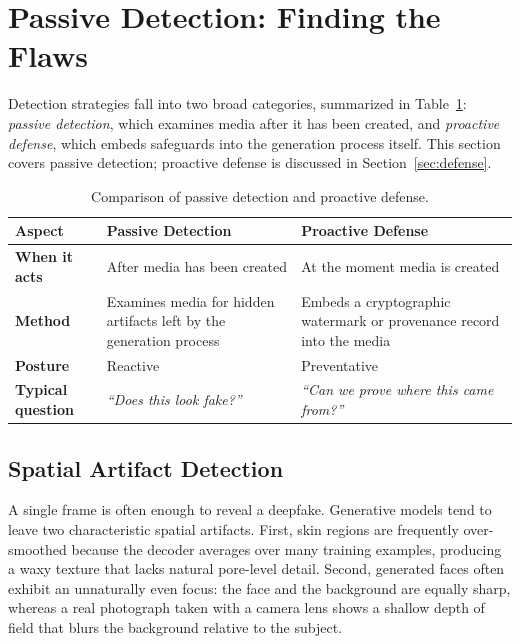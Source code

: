 \documentclass[a4paper,12pt]{article}
\begin{document}
\section{Passive Detection: Finding the Flaws}
\label{sec:detection}

Detection strategies fall into two broad categories, summarized in Table~\ref{tab:passive-proactive}: \textit{passive detection}, which examines media after it has been created, and \textit{proactive defense}, which embeds safeguards into the generation process itself. This section covers passive detection; proactive defense is discussed in Section~\ref{sec:defense}.

\begin{table}[H]
    \centering
    \renewcommand{\arraystretch}{1.3}
    \begin{tabular}{@{} >{\raggedright\arraybackslash}p{3.2cm} >{\raggedright\arraybackslash}p{5.6cm} >{\raggedright\arraybackslash}p{5.6cm} @{}}
        \toprule
        \rowcolor{gray!15}
        \textbf{Aspect} & \textbf{Passive Detection} & \textbf{Proactive Defense} \\
        \midrule
        \textbf{When it acts} & After media has been created & At the moment media is created \\
        \midrule
        \textbf{Method} & Examines media for hidden artifacts left by the generation process & Embeds a cryptographic watermark or provenance record into the media \\
        \midrule
        \textbf{Posture} & Reactive & Preventative \\
        \midrule
        \textbf{Typical question} & \textit{``Does this look fake?''} & \textit{``Can we prove where this came from?''} \\
        \bottomrule
    \end{tabular}
    \caption{Comparison of passive detection and proactive defense.}
    \label{tab:passive-proactive}
\end{table}

\subsection{Spatial Artifact Detection}
\label{subsec:spatial}

A single frame is often enough to reveal a deepfake. Generative models tend to leave two characteristic spatial artifacts. First, skin regions are frequently over-smoothed because the decoder averages over many training examples, producing a waxy texture that lacks natural pore-level detail. Second, generated faces often exhibit an unnaturally even focus: the face and the background are equally sharp, whereas a real photograph taken with a camera lens shows a shallow depth of field that blurs the background relative to the subject.
\end{document}

